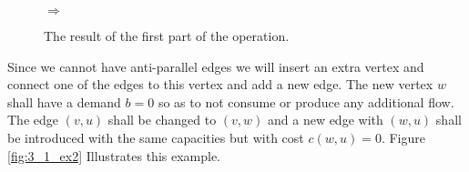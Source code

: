 \begin{figure}[H]
\centering
\begin{minipage}{.25\textwidth}
\centering
{}
\label{fig:3_1_ex1a}
\end{minipage}%
$\Longrightarrow$
\begin{minipage}{.25\textwidth}
\centering
{}
\label{fig:3_1_ex1b}
\end{minipage}

\caption{The result of the first part of the operation.}
\label{fig:3_1_ex1}
\end{figure}

Since we cannot have anti-parallel edges we will insert an extra vertex and
connect one of the edges to this vertex and add a new edge. The new vertex $w$
shall have a demand $b = 0$ so as to not consume or produce any additional
flow. The edge $(v,u)$ shall be changed to $(v,w)$ and a new edge with $(w,u)$
shall be introduced with the same capacities but with cost $c(w,u) = 0$. Figure
\ref{fig:3_1_ex2} Illustrates this example.

